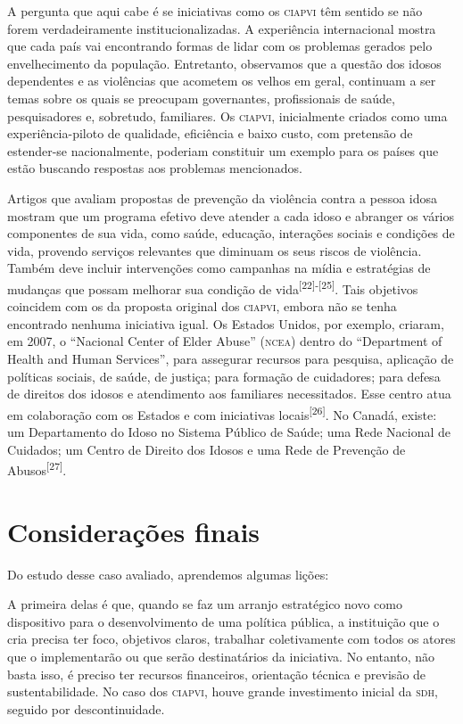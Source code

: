 \documentclass{article}
\begin{document}
A pergunta que aqui cabe é se iniciativas como os \textsc{ciapvi} têm sentido se não
forem verdadeiramente institucionalizadas. A experiência internacional mostra
que cada país vai encontrando formas de lidar com os problemas gerados pelo
envelhecimento da população. Entretanto, observamos que a questão dos idosos
dependentes e as violências que acometem os velhos em geral, continuam a ser
temas sobre os quais se preocupam governantes, profissionais de saúde,
pesquisadores e, sobretudo, familiares. Os \textsc{ciapvi}, inicialmente criados como uma
experiência-piloto de qualidade, eficiência e baixo custo, com pretensão de
estender-se nacionalmente, poderiam constituir um exemplo para os países que
estão buscando respostas aos problemas mencionados.

Artigos que avaliam propostas de prevenção da violência contra a pessoa idosa
mostram que um programa efetivo deve atender a cada idoso e abranger os vários
componentes de sua vida, como saúde, educação, interações sociais e condições de
vida, provendo serviços relevantes que diminuam os seus riscos de violência.
Também deve incluir intervenções como campanhas na mídia e estratégias de
mudanças que possam melhorar sua condição de
vida\textsuperscript{[}\textsuperscript{22}\textsuperscript{]}\textsuperscript{-}\textsuperscript{[}\textsuperscript{25}\textsuperscript{]}. Tais objetivos coincidem com os da proposta original dos \textsc{ciapvi}, embora não se
tenha encontrado nenhuma iniciativa igual. Os Estados Unidos, por exemplo,
criaram, em 2007, o “Nacional Center of Elder Abuse” (\textsc{ncea}) dentro do
“Department of Health and Human Services”, para assegurar recursos para
pesquisa, aplicação de políticas sociais, de saúde, de justiça; para formação de
cuidadores; para defesa de direitos dos idosos e atendimento aos familiares
necessitados. Esse centro atua em colaboração com os Estados e com iniciativas
locais\textsuperscript{[}\textsuperscript{26}\textsuperscript{]}. No Canadá, existe: um Departamento do Idoso no Sistema Público de Saúde; uma
Rede Nacional de Cuidados; um Centro de Direito dos Idosos e uma Rede de
Prevenção de Abusos\textsuperscript{[}\textsuperscript{27}\textsuperscript{]}.

\section{Considerações finais}

Do estudo desse caso avaliado, aprendemos algumas lições:

A primeira delas é que, quando se faz um arranjo estratégico novo como
dispositivo para o desenvolvimento de uma política pública, a instituição que o
cria precisa ter foco, objetivos claros, trabalhar coletivamente com todos os
atores que o implementarão ou que serão destinatários da iniciativa. No entanto,
não basta isso, é preciso ter recursos financeiros, orientação técnica e
previsão de sustentabilidade. No caso dos \textsc{ciapvi}, houve grande investimento
inicial da \textsc{sdh}, seguido por descontinuidade.
\end{document}
